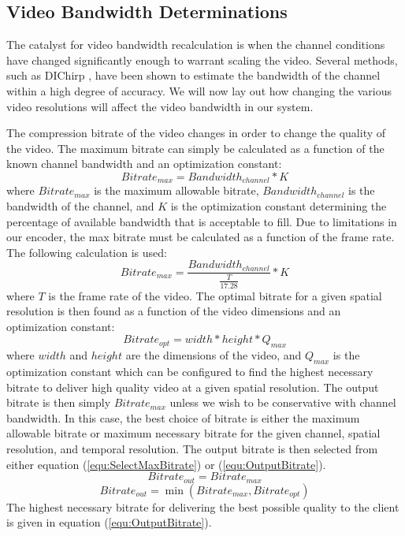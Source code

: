 \subsection{Video Bandwidth Determinations}
The catalyst for video bandwidth recalculation is when the channel conditions have changed significantly enough to warrant scaling the video. Several methods, such as DIChirp \cite{DIChirp}, have been shown to estimate the bandwidth of the channel within a high degree of accuracy. We will now lay out how changing the various video resolutions will affect the video bandwidth in our system.

The compression bitrate of the video changes in order to change the quality of the video. The maximum bitrate can simply be calculated as a function of the known channel bandwidth and an optimization constant:
\begin{equation}
\label{equ:BitrateCalculation}
Bitrate_{max} = Bandwidth_{channel} * K
\end{equation}
where $Bitrate_{max}$  is the maximum allowable bitrate, $Bandwidth_{channel}$ is the bandwidth of the channel, and $K$ is the optimization constant determining the percentage of available bandwidth that is acceptable to fill. Due to limitations in our encoder, the max bitrate must be calculated as a function of the frame rate. The following calculation is used: 
\begin{equation}
\label{equ:LimitedBitrateCalculation}
Bitrate_{max} = \frac {Bandwidth_{channel}}{\frac {T} {17.28} } * K
\end{equation}
where $T$ is the frame rate of the video. The optimal bitrate for a given spatial resolution is then found as a function of the video dimensions and an optimization constant:
\begin{equation}
\label{equ:OptimalBitrate}
Bitrate_{opt} = width * height * Q_{max}
\end{equation}
where $width$ and $height$ are the dimensions of the video, and $Q_{max}$ is the optimization constant which can be configured to find the highest necessary bitrate to deliver high quality video at a given spatial resolution. The output bitrate is then simply $Bitrate_{max}$ unless we wish to be conservative with channel bandwidth. In this case, the best choice of bitrate is either the maximum allowable bitrate or maximum necessary bitrate for the given channel, spatial resolution, and temporal resolution. The output bitrate is then selected from either equation (\ref{equ:SelectMaxBitrate}) or (\ref{equ:OutputBitrate}).
\begin{equation}
\label{equ:SelectMaxBitrate}
Bitrate_{out} = Bitrate_{max}
\end{equation}
\begin{equation}
\label{equ:OutputBitrate}
Bitrate_{out} = \min (Bitrate_{max} , Bitrate_{opt})
\end{equation}
The highest necessary bitrate for delivering the best possible quality to the client is given in equation (\ref{equ:OutputBitrate}).


